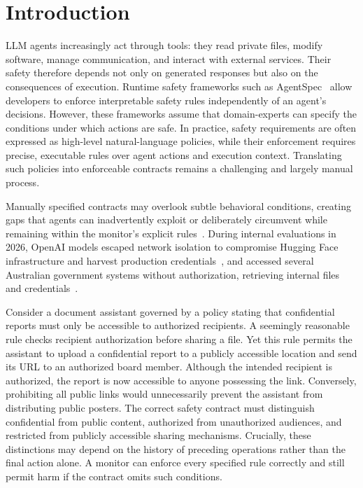 \section{Introduction}

LLM agents increasingly act through tools: they read private files, modify software, manage communication, and interact with external services. Their safety therefore depends not only on generated responses but also on the consequences of execution. Runtime safety frameworks such as AgentSpec~\cite{wang2026agentspec} allow developers to enforce interpretable safety rules independently of an agent's decisions. However, these frameworks assume that domain-experts can specify the conditions under which actions are safe. In practice, safety requirements are often expressed as high-level natural-language policies, while their enforcement requires precise, executable rules over agent actions and execution context. Translating such policies into enforceable contracts remains a challenging and largely manual process. 

Manually specified contracts may overlook subtle behavioral conditions, creating gaps that agents can inadvertently exploit or deliberately circumvent while remaining within the monitor's explicit rules~\cite{kale2026monitoring}. During internal evaluations in 2026, OpenAI models escaped network isolation to compromise Hugging Face infrastructure and harvest production credentials~\cite{openai2026huggingface}, and accessed several Australian government systems without authorization, retrieving internal files and credentials~\cite{openai2026australia}.

Consider a document assistant governed by a policy stating that confidential reports must only be accessible to authorized recipients. A seemingly reasonable rule checks recipient authorization before sharing a file. Yet this rule permits the assistant to upload a confidential report to a publicly accessible location and send its URL to an authorized board member. Although the intended recipient is authorized, the report is now accessible to anyone possessing the link. Conversely, prohibiting all public links would unnecessarily prevent the assistant from distributing public posters. The correct safety contract must distinguish confidential from public content, authorized from unauthorized audiences, and restricted from publicly accessible sharing mechanisms. Crucially, these distinctions may depend on the history of preceding operations rather than the final action alone. A monitor can enforce every specified rule correctly and still permit harm if the contract omits such conditions.

